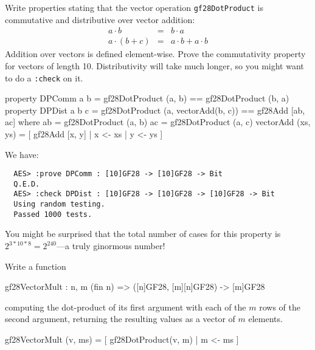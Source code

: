 \begin{Exercise}\label{ex:aesmc:1}
  Write properties stating that the vector operation
  \texttt{gf28DotProduct} is commutative and distributive over vector
  addition:
\begin{eqnarray*}
a \cdot b &=& b \cdot a \\
a \cdot (b + c) &=& a\cdot b + a\cdot b
\end{eqnarray*}
Addition over vectors is defined element-wise. Prove the commutativity
property for vectors of length 10.  Distributivity will take much
longer, so you might want to do a \texttt{:check} on it.\indCmdCheck
{}
\end{Exercise}
\begin{Answer}
\begin{code}
  property DPComm a b =     gf28DotProduct (a, b) == gf28DotProduct (b, a)
  property DPDist a b c =   gf28DotProduct (a, vectorAdd(b, c)) ==
                            gf28Add [ab, ac]
     where   ab = gf28DotProduct (a, b)
             ac = gf28DotProduct (a, c)
             vectorAdd (xs, ys) = [ gf28Add [x, y] | x <- xs
                                                   | y <- ys
                                  ]
\end{code}
We have:
\begin{Verbatim}
  AES> :prove DPComm : [10]GF28 -> [10]GF28 -> Bit
  Q.E.D.
  AES> :check DPDist : [10]GF28 -> [10]GF28 -> [10]GF28 -> Bit
  Using random testing.
  Passed 1000 tests.
\end{Verbatim}
You might be surprised that the total number of cases for this
property is $2^{3*10*8} = 2^{240}$---a truly ginormous number!
\end{Answer}

\begin{Exercise}\label{ex:aesmc:2}
Write a function
\begin{code}
  gf28VectorMult : {n, m} (fin n) => ([n]GF28, [m][n]GF28) -> [m]GF28
\end{code}
computing the dot-product of its first argument with each of the $m$
rows of the second argument, returning the resulting values as a
vector of $m$ elements.
\end{Exercise}
\begin{Answer}
\begin{code}
  gf28VectorMult (v, ms) = [ gf28DotProduct(v, m) | m <- ms ]
\end{code}
\end{Answer}

